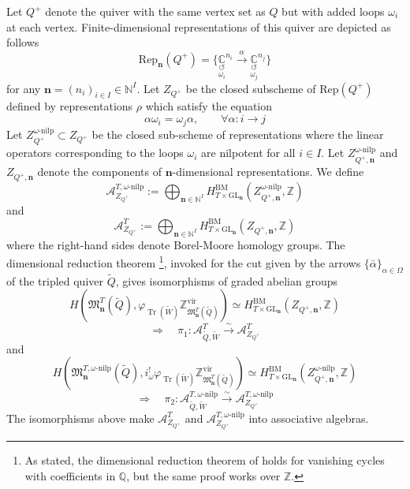 \documentclass{amsart}
\def\BC{{\mathbb{C}}}
\DeclareMathOperator{\Tr}{\mathrm{Tr}}
\def\vir{\mathrm{vir}}
\def\nn{{\mathbb{N}^I}}
\def\bn{{\boldsymbol{n}}}
\def\edge{\Omega}
\def\dalpha{\bar{\alpha}}
\begin{document}
\medskip 

\noindent Let $Q^+$ denote the quiver with the same vertex set as $Q$ but with added loops $\omega_i$ at each vertex. Finite-dimensional representations of this quiver are depicted as follows
$$
\text{Rep}_{\bn}(Q^+) = \Big\{\underset{\omega_i}{\underset{\circlearrowleft}{\BC}}^{n_i} \xrightarrow{\alpha} \underset{\omega_j}{\underset{\circlearrowleft}{\BC}}^{n_j}\Big\}
$$
for any $\bn = (n_i)_{i\in I} \in \nn$. Let $Z_{Q^{+}}$ be the closed subscheme of $\mathrm{Rep}(Q^{+})$ defined by representations $\rho$ which satisfy the equation
$$
\alpha \omega_i = \omega_j \alpha, \qquad \forall \alpha : i \rightarrow j
$$
Let $ Z^{\omega\text{-nilp}}_{Q^{+}} \subset Z_{Q^{+}}$ be the closed sub-scheme of representations where the linear operators corresponding to the loops $\omega_i$ are nilpotent for all $i \in I$. Let $Z^{\omega\text{-nilp}}_{Q^{+},\bn}$ and $Z_{Q^{+},\bn}$ denote the components of $\bn$-dimensional representations. We define 
\[ 
\mathcal{A}^{T, \omega\text{-nilp}}_{Z_{Q^{+}}} := \bigoplus_{\bn \in \mathbb{N}^I} H^{\mathrm{BM}}_{T \times \mathrm{GL}_{\bn}}(Z^{\omega\text{-nilp}}_{Q^{+},\bn}, \mathbb{Z})
\] 
and 
\[ \mathcal{A}^{T}_{Z_{Q^{+}}} := \bigoplus_{\bn \in \mathbb{N}^I} H^{\mathrm{BM}}_{T \times \mathrm{GL}_{\bn}}(Z_{Q^{+},\bn}, \mathbb{Z})
\]  
where the right-hand sides denote Borel-Moore homology groups.
The dimensional reduction theorem \cite[Theorem A.11]{davisonlocalized}\footnote{As stated, the dimensional reduction theorem of \cite{davisonlocalized} holds for vanishing cycles with coefficients in $\mathbb{Q}$, but the same proof works over $\mathbb{Z}$.}, invoked for the cut given by the arrows $\{\dalpha\}_{\alpha \in \edge}$ of the tripled quiver $\tilde{Q}$, gives isomorphisms of graded abelian groups
\begin{equation}
H(\mathfrak{M}^{T}_{\bn}(\tilde{Q}), \varphi_{\Tr(\tilde{W})}\mathbb{ Z}^{\vir}_{\mathfrak{M}_{\bn}^T(\tilde{Q})} ) \simeq H^{\mathrm{BM}}_{T \times \mathrm{GL}_{\bn}}(Z_{Q^{+},\bn}, \mathbb{Z})
\end{equation}
\begin{equation*}
\Rightarrow \quad \pi_1:\mathcal{A}^T_{\tilde{Q},\tilde{W}} \xrightarrow{\sim} \mathcal{A}^{T}_{Z_{Q^{+}}} 
\end{equation*} 
and 
\begin{equation} \label{eqn:dimensionreductionnilpotent}
H(\mathfrak{M}^{T,\omega\text{-nilp}}_{\bn}(\tilde{Q}), i^{!}_{\omega}\varphi_{\Tr(\tilde{W})}\mathbb{Z}^{\vir}_{\mathfrak{M}_{\bn}^T(\tilde{Q})} ) \simeq H^{\mathrm{BM}}_{T \times \mathrm{GL}_{\bn}}(Z^{\omega\text{-nilp}}_{Q^{+},\bn},\mathbb{Z})
\end{equation}
\begin{equation*}
\Rightarrow \quad \pi_2 \colon \mathcal{A}^{T,\omega\text{-nilp}}_{\tilde{Q},\tilde{W}} \xrightarrow{\sim} \mathcal{A}^{T,\omega\text{-nilp}}_{Z_{Q^{+}}} 
\end{equation*}
The isomorphisms above make $\mathcal{A}^{T}_{Z_{Q^{+}}}$ and $\mathcal{A}^{T,\omega\text{-nilp}}_{Z_{Q^{+}}}$ into associative algebras.
\end{document}
